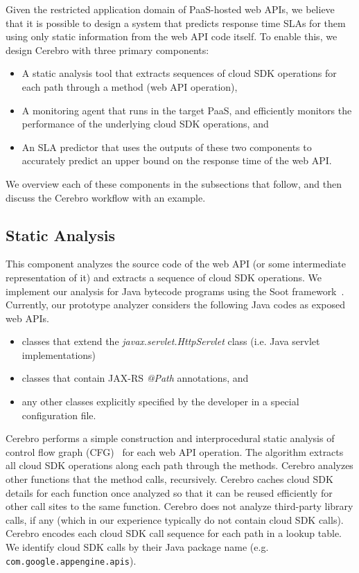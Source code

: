 Given the restricted application domain of PaaS-hosted web APIs, we believe
that it is possible to design a system that predicts response time SLAs for
them using only static information from the web API code itself.  To enable
this, we design Cerebro with three primary components:
\begin{itemize}
\item A static analysis tool that extracts sequences of cloud SDK operations for 
each path through a method (web API operation),
\item A monitoring agent that runs in the target PaaS, and efficiently monitors 
the performance of the underlying cloud SDK operations, and
\item An SLA predictor that uses the outputs of these two components to accurately predict an upper bound on the response time of the web API.
\end{itemize}
We overview each of these components in the subsections that follow, and then 
discuss the Cerebro workflow with an example.

\subsection{Static Analysis}
 This component analyzes the source code of the web API
(or some intermediate representation of it) and extracts a sequence of cloud SDK operations.
We implement our analysis for Java bytecode programs
using the Soot framework~\cite{Vallee-Rai:2010:SJB:1925805.1925818}.
Currently, our prototype analyzer considers the 
following Java codes as exposed web APIs.
\begin{itemize}
\item classes that extend the \textit{javax.servlet.HttpServlet} class (i.e. Java servlet implementations)
\item classes that contain JAX-RS \textit{@Path} annotations, and
\item any other classes explicitly specified by the developer in a special configuration file.
\end{itemize}

Cerebro performs a simple construction and interprocedural static analysis 
of control flow graph 
(CFG)~\cite{Allen:1970:CFA:800028.808479,Aho:1986:CPT:6448,Morgan:1998:BOC:288765,Muchnick:1998:ACD:286076} for each web API operation.
The algorithm extracts all cloud SDK operations along
each path through the methods. Cerebro analyzes other functions
that the method calls, recursively.  Cerebro caches cloud SDK details for each function 
once analyzed so that it can be reused efficiently for other call sites to the same
function. Cerebro does not analyze third-party library calls, if any 
(which in our experience typically do not contain cloud SDK calls). Cerebro encodes
each cloud SDK call sequence for each path in a lookup table. We identify
cloud SDK calls by their Java package name (e.g. \texttt{com.google.appengine.apis}).

